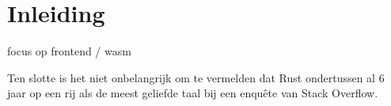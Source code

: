 \chapter{Inleiding}

focus op frontend / wasm

Ten slotte is het niet onbelangrijk om te vermelden dat Rust ondertussen al 6 jaar op een rij als de meest
geliefde taal bij een enquête van Stack Overflow. \cite{so_enquete} 
